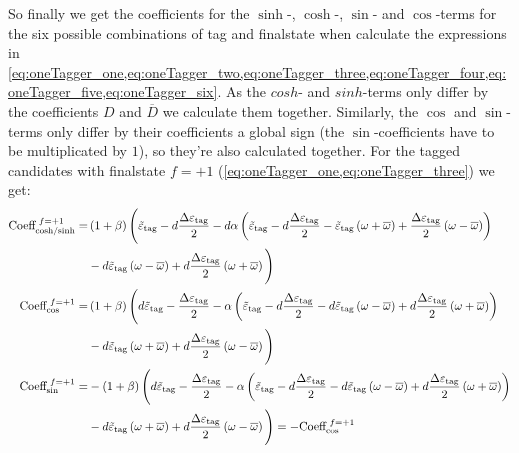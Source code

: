 So finally we get the coefficients for the $\sinh$-, $\cosh$-, $\sin$- and $\cos$-terms for the six possible combinations of tag and finalstate
when calculate the expressions in \cref{eq:oneTagger_one,eq:oneTagger_two,eq:oneTagger_three,eq:oneTagger_four,eq:oneTagger_five,eq:oneTagger_six}.
As the $cosh$- and $sinh$-terms only differ by the coefficients $D$ and $\overline{D}$ we calculate them together. Similarly, the $\cos$ and
$\sin$-terms only differ by their coefficients a global sign (the $\sin$-coefficients have to be multiplicated by $1$), so they're also calculated together. For the tagged candidates with finalstate $f=+1$ (\cref{eq:oneTagger_one,eq:oneTagger_three}) we get:
\begin{align*}
\text{Coeff}_\text{cosh/sinh}^{\hspace{0.3em}f=+1} =& \left(1+\beta\right)\Bigg(\tilde{\varepsilon}_\text{tag}-d\frac{\Delta\varepsilon_\text{tag}}{2}
    -d\alpha\left(\tilde{\varepsilon}_\text{tag}-d\frac{\Delta\varepsilon_\text{tag}}{2}
    -\tilde{\varepsilon}_\text{tag}\left(\omega+\overline{\omega}\right)
    +\frac{\Delta\varepsilon_\text{tag}}{2}\left(\omega-\overline{\omega}\right)\right)\\
    &-d\tilde{\varepsilon}_\text{tag}\left(\omega-\overline{\omega}\right)
    +d\frac{\Delta\varepsilon_\text{tag}}{2}\left(\omega+\overline{\omega}\right)\Bigg)\\
\text{Coeff}_\text{cos}^{\hspace{0.3em}f=+1} =& \left(1+\beta\right)\Bigg(d\tilde{\varepsilon}_\text{tag}-\frac{\Delta\varepsilon_\text{tag}}{2}
    -\alpha\left(\tilde{\varepsilon}_\text{tag}-d\frac{\Delta\varepsilon_\text{tag}}{2}
    -d\tilde{\varepsilon}_\text{tag}\left(\omega-\overline{\omega}\right)
    +d\frac{\Delta\varepsilon_\text{tag}}{2}\left(\omega+\overline{\omega}\right)\right)\\
    &-d\tilde{\varepsilon}_\text{tag}\left(\omega+\overline{\omega}\right)
    +d\frac{\Delta\varepsilon_\text{tag}}{2}\left(\omega-\overline{\omega}\right)\Bigg)\\
\text{Coeff}_\text{sin}^{\hspace{0.3em}f=+1} =& -\left(1+\beta\right)\Bigg(d\tilde{\varepsilon}_\text{tag}-\frac{\Delta\varepsilon_\text{tag}}{2}
    -\alpha\left(\tilde{\varepsilon}_\text{tag}-d\frac{\Delta\varepsilon_\text{tag}}{2}
    -d\tilde{\varepsilon}_\text{tag}\left(\omega-\overline{\omega}\right)
    +d\frac{\Delta\varepsilon_\text{tag}}{2}\left(\omega+\overline{\omega}\right)\right)\\
    &-d\tilde{\varepsilon}_\text{tag}\left(\omega+\overline{\omega}\right)
    +d\frac{\Delta\varepsilon_\text{tag}}{2}\left(\omega-\overline{\omega}\right)\Bigg) = -\text{Coeff}_\text{cos}^{\hspace{0.3em}f=+1}
\end{align*}
